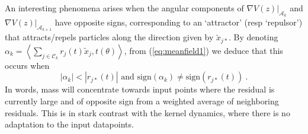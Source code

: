 An interesting phenomena arises when the angular components of $\nabla V(z)\lvert_{\mathcal{A}_k}$ and $\nabla V(z)\lvert_{\mathcal{A}_{k+1}}$ have opposite signs, corresponding to an `attractor' (resp `repulsor') that attracts/repels particles along the direction given by $\tilde{x}_{j*}$. By denoting $\alpha_k = \left \langle \sum_{j \in \mathcal{C}_k} r_j(t) \tilde{x}_j, t(\theta) \right \rangle$, from (\ref{eq:meanfield1}) we deduce that this occurs when
\begin{equation}
 \left|  \alpha_k \right| < |r_{j*}(t)| \text{ and } \text{sign}(\alpha_k) \neq \text{sign}(r_{j*}(t))~.    
\end{equation}
In words, mass will concentrate towards input points where the residual is currently large and of opposite sign from a weighted average of neighboring residuals. This is in stark contrast with the kernel dynamics, where there is no adaptation to the input datapoints. 












